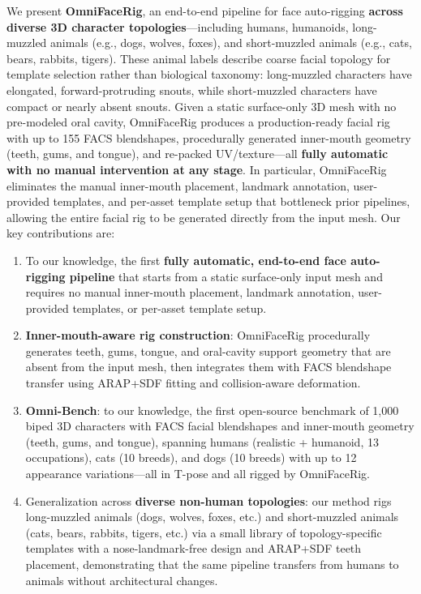 \documentclass[acmtog,anonymous,review]{acmart}
\begin{document}
We present \textbf{OmniFaceRig}, an end-to-end pipeline for face auto-rigging \textbf{across diverse 3D character topologies}---including humans, humanoids, long-muzzled animals (e.g., dogs, wolves, foxes), and short-muzzled animals (e.g., cats, bears, rabbits, tigers). These animal labels describe coarse facial topology for template selection rather than biological taxonomy: long-muzzled characters have elongated, forward-protruding snouts, while short-muzzled characters have compact or nearly absent snouts. Given a static surface-only 3D mesh with no pre-modeled oral cavity, OmniFaceRig produces a production-ready facial rig with up to 155 FACS blendshapes, procedurally generated inner-mouth geometry (teeth, gums, and tongue), and re-packed UV/texture---all \textbf{fully automatic with no manual intervention at any stage}. In particular, OmniFaceRig eliminates the manual inner-mouth placement, landmark annotation, user-provided templates, and per-asset template setup that bottleneck prior pipelines, allowing the entire facial rig to be generated directly from the input mesh. Our key contributions are:

\begin{enumerate}
  \item To our knowledge, the first \textbf{fully automatic, end-to-end face auto-rigging pipeline} that starts from a static surface-only input mesh and requires no manual inner-mouth placement, landmark annotation, user-provided templates, or per-asset template setup.
  \item \textbf{Inner-mouth-aware rig construction}: OmniFaceRig procedurally generates teeth, gums, tongue, and oral-cavity support geometry that are absent from the input mesh, then integrates them with FACS blendshape transfer using ARAP+SDF fitting and collision-aware deformation.
  \item \textbf{Omni-Bench}: to our knowledge, the first open-source benchmark of 1,000 biped 3D characters with FACS facial blendshapes and inner-mouth geometry (teeth, gums, and tongue), spanning humans (realistic + humanoid, 13 occupations), cats (10 breeds), and dogs (10 breeds) with up to 12 appearance variations---all in T-pose and all rigged by OmniFaceRig.
  \item Generalization across \textbf{diverse non-human topologies}: our method rigs long-muzzled animals (dogs, wolves, foxes, etc.) and short-muzzled animals (cats, bears, rabbits, tigers, etc.) via a small library of topology-specific templates with a nose-landmark-free design and ARAP+SDF teeth placement, demonstrating that the same pipeline transfers from humans to animals without architectural changes.
\end{enumerate}
\end{document}
